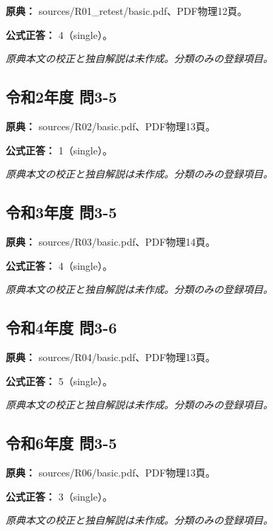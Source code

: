 \noindent\textbf{原典：} sources/R01\_retest/basic.pdf、PDF物理12頁。

\textbf{公式正答：} 4（single）。

\par\textit{原典本文の校正と独自解説は未作成。分類のみの登録項目。}

\subsection{令和2年度 問3-5}
\label{q:r02-reg-basic-3-5}

\noindent\textbf{原典：} sources/R02/basic.pdf、PDF物理13頁。

\textbf{公式正答：} 1（single）。

\par\textit{原典本文の校正と独自解説は未作成。分類のみの登録項目。}

\subsection{令和3年度 問3-5}
\label{q:r03-reg-basic-3-5}

\noindent\textbf{原典：} sources/R03/basic.pdf、PDF物理14頁。

\textbf{公式正答：} 4（single）。

\par\textit{原典本文の校正と独自解説は未作成。分類のみの登録項目。}

\subsection{令和4年度 問3-6}
\label{q:r04-reg-basic-3-6}

\noindent\textbf{原典：} sources/R04/basic.pdf、PDF物理13頁。

\textbf{公式正答：} 5（single）。

\par\textit{原典本文の校正と独自解説は未作成。分類のみの登録項目。}

\subsection{令和6年度 問3-5}
\label{q:r06-reg-basic-3-5}

\noindent\textbf{原典：} sources/R06/basic.pdf、PDF物理13頁。

\textbf{公式正答：} 3（single）。

\par\textit{原典本文の校正と独自解説は未作成。分類のみの登録項目。}

